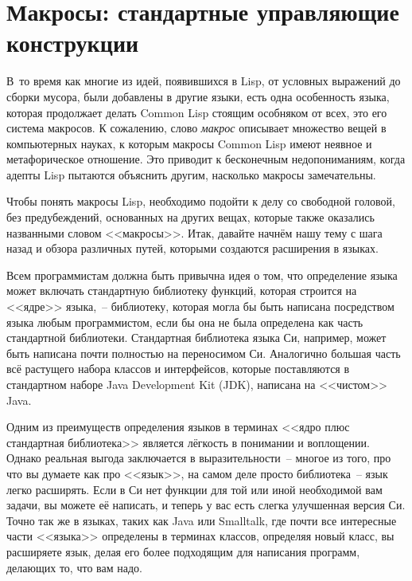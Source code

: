 \chapter{Макросы: стандартные управляющие конструкции}
\label{ch:07}

\thispagestyle{empty}

В~то время как многие из идей, появившихся в Lisp, от условных выражений до сборки
мусора, были добавлены в другие языки, есть одна особенность языка, которая продолжает
делать Common Lisp стоящим особняком от всех, это его система макросов. К сожалению, слово
\textit{макрос} описывает множество вещей в компьютерных науках, к которым макросы Common Lisp
имеют неявное и метафорическое отношение. Это приводит к бесконечным недопониманиям,
когда адепты Lisp пытаются объяснить другим, насколько макросы
замечательны.

Чтобы понять макросы Lisp, необходимо подойти к делу со свободной головой, без
предубеждений, основанных на других вещах, которые также оказались названными словом
<<макросы>>. Итак, давайте начнём нашу тему с шага назад и обзора различных путей, которыми
создаются расширения в языках.

Всем программистам должна быть привычна идея о том, что определение языка может включать
стандартную библиотеку функций, которая строится на <<ядре>> языка,~-- библиотеку, которая
могла бы быть написана посредством языка любым прог\-рам\-мис\-том, если бы она не была
определена как часть стандартной библиотеки. Стандартная библиотека языка Си, например,
может быть написана почти полностью на переносимом Си. Аналогично большая часть всё
растущего набора классов и интерфейсов, которые поставляются в стандартном наборе Java
Development Kit (JDK), написана на <<чистом>> Java.

Одним из преимуществ определения языков в терминах <<ядро плюс стандартная библиотека>> является
лёгкость в понимании и воплощении. Однако реальная выгода заключается в выразительности~--
многое из того, про что вы думаете как про <<язык>>, на самом деле просто библиотека~-- язык
легко расширять. Если в Си нет функции для той или иной необходимой вам задачи, вы можете
её написать, и теперь у вас есть слегка улучшенная версия Си. Точно так же в языках, таких
как Java или Smalltalk, где почти все интересные части <<языка>> определены в терминах
классов, определяя новый класс, вы расширяете язык, делая его более подходящим для
написания программ, делающих то, что вам надо.

